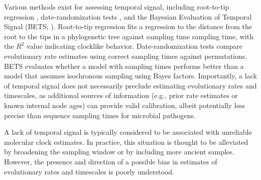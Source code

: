 \documentclass[11pt]{article}
\begin{document}
Various methods exist for assessing temporal signal, including root-to-tip regression \citep{buonagurio1986evolution, gojobori1990molecular, drummond2003inference}, date-randomization tests \citep{ramsden2009hantavirus, duchene2015performance, duchene2018inferring, trovao2015host}, and the Bayesian Evaluation of Temporal Signal (BETS; \cite{duchene2020bayesian}). Root-to-tip regression fits a regression to the distance from the root to the tips in a phylogenetic tree against sampling time sampling time, with the $R^2$ value indicating clocklike behavior. Date-randomization tests compare evolutionary rate estimates using correct sampling times against permutations. BETS evaluates whether a model with sampling times performs better than a model that assumes isochronous sampling using Bayes factors. Importantly, a lack of temporal signal does not necessarily preclude estimating evolutionary rates and timescales, as additional sources of information (e.g., prior rate estimates or known internal node ages) can provide valid calibration, albeit potentially less precise than sequence sampling times for microbial pathogens.

A lack of temporal signal is typically considered to be associated with unreliable molecular clock estimates. In practice, this situation is thought to be alleviated by broadening the sampling window or by including more ancient samples. However, the presence and direction of a possible bias in estimates of evolutionary rates and timescales is poorly understood. 



\end{document}
